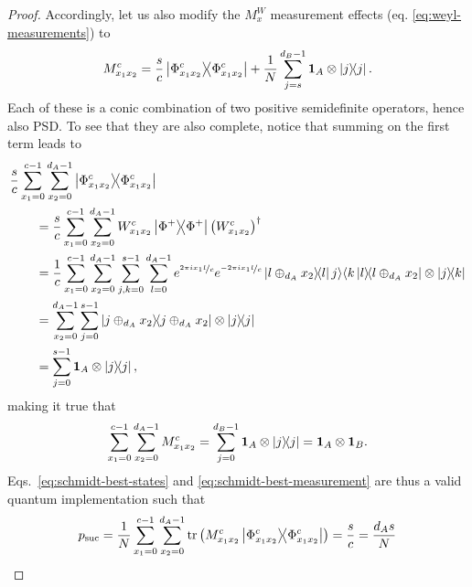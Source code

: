 \begin{proof}
        Accordingly, let us also modify the $M_x^W$ measurement effects (eq. \ref{eq:weyl-measurements}) to
        \begin{equation}
            M_{x_1 x_2}^c = \frac{s}{c} \ketbra{\Phi_{x_1 x_2}^c}{\Phi_{x_1 x_2}^c} + \frac{1}{N} \sum_{j=s}^{d_B - 1} \mathbf{1}_A \otimes \ketbra{j}{j} .
            \label{eq:schmidt-best-measurement}
        \end{equation}
        Each of these is a conic combination of two positive semidefinite operators, hence also PSD. To see that they are also complete, notice that summing on the first term leads to
        \begin{align*}
            &\frac{s}{c} \sum_{x_1 = 0}^{c-1} \sum_{x_2 = 0}^{d_A - 1} \ketbra{\Phi_{x_1 x_2}^c}{\Phi_{x_1 x_2}^c} \\
            &\qquad= \frac{s}{c} \sum_{x_1 = 0}^{c-1} \sum_{x_2 = 0}^{d_A - 1} W_{x_1 x_2}^c \ketbra{\Phi^+}{\Phi^+} \left( W_{x_1 x_2}^c \right) ^\dagger \\
            &\qquad= \frac{1}{c} \sum_{x_1 = 0}^{c-1} \sum_{x_2 = 0}^{d_A - 1} \sum_{j, k = 0}^{s - 1} \sum_{l=0}^{d_A-1} e^{\nicefrac{2 \pi i x_1 l}{c}} e^{\nicefrac{- 2 \pi i x_1 l}{c}} \ketbra{l \oplus_{d_A} x_2}{l} j \rangle \langle k \ketbra{l}{l \oplus_{d_A} x_2} \otimes \ketbra{j}{k} \\
            &\qquad= \sum_{x_2=0}^{d_A - 1} \sum_{j=0}^{s-1} \ketbra{j \oplus_{d_A} x_2}{j \oplus_{d_A} x_2} \otimes \ketbra{j}{j} \\
            &\qquad= \sum_{j=0}^{s-1} \mathbf{1}_A \otimes \ketbra{j}{j} ,
        \end{align*}
        making it true that
        $$
            \sum_{x_1 = 0}^{c-1} \sum_{x_2 = 0}^{d_A - 1} M_{x_1 x_2}^c = \sum_{j=0}^{d_B - 1} \mathbf{1}_A \otimes \ketbra{j}{j} = \mathbf{1}_A \otimes \mathbf{1}_B .
        $$
        Eqs.~\eqref{eq:schmidt-best-states} and \eqref{eq:schmidt-best-measurement} are thus a valid quantum implementation such that
        \begin{align*}
            p_{\text{suc}} = \frac{1}{N} \sum_{x_1=0}^{c-1} \sum_{x_2=0}^{d_A - 1} \text{tr}\left( M_{x_1 x_2}^c \ketbra{\Phi_{x_1 x_2}^c}{\Phi_{x_1 x_2}^c} \right) = \frac{s}{c} = \frac{d_A s}{N}
        \end{align*}
    \end{proof}


